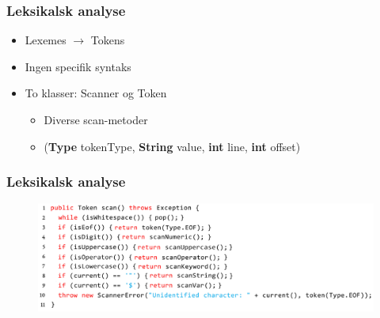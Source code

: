 \begin{frame}
  \frametitle{Leksikalsk analyse}

  \begin{itemize}
    \item Lexemes $\rightarrow$ Tokens
    \item Ingen specifik syntaks
    \item To klasser: Scanner og Token
      \begin{itemize}
	\item Diverse scan-metoder
	\item (\textbf{Type} tokenType, \textbf{String}
        value, \textbf{int} line, \textbf{int} offset)
      \end{itemize}
      
  \end{itemize}

\end{frame}

  

\begin{frame}
  \frametitle{Leksikalsk analyse}

  \begin{figure}
    \includegraphics[width=1\linewidth]{billeder/scan-metode}
  \end{figure}

\end{frame}

